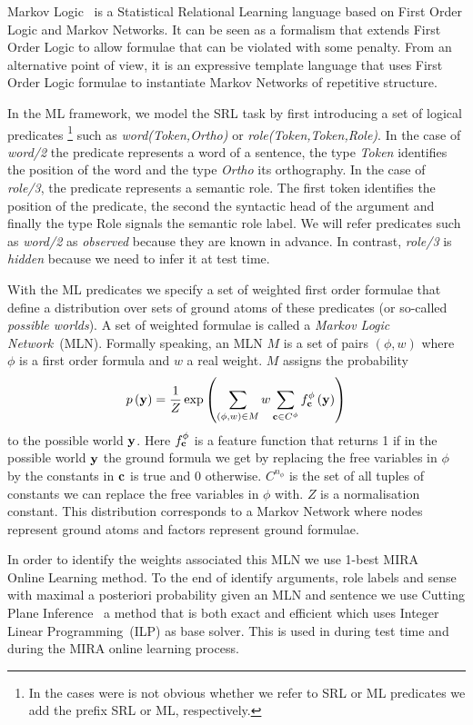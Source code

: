 Markov Logic~\citep[ML,][]{richardson05markov} is a Statistical Relational 
Learning language based on First Order Logic and Markov Networks. It can be seen 
as a formalism that extends First Order Logic to allow formulae that can be 
violated with some penalty. From an alternative point of view, it is an 
expressive template language that uses First Order Logic formulae to instantiate
Markov Networks of repetitive structure. 

In the ML framework,  we model the SRL task by first introducing a set of 
logical predicates \footnote{In the cases were is not obvious whether we refer 
to SRL or ML predicates we add the prefix SRL or ML, respectively.} such as 
\emph{word(Token,Ortho)} or \emph{role(Token,Token,Role)}. In the case of 
\emph{word/2} the predicate represents a word of a sentence, the type 
\emph{Token} identifies the position of the word and the type \emph{Ortho} its 
orthography. In the case of \emph{role/3}, the predicate represents a semantic 
role. The first token identifies the position of the predicate, the second the 
syntactic head of the argument and finally the type Role signals the semantic 
role label. We will refer predicates such as \emph{word/2} as \emph{observed} 
because they are known in advance. In contrast, \emph{role/3} is \emph{hidden} 
because we need to infer it at test time.

With the ML predicates we specify a set of weighted first order formulae that 
define a distribution over sets of ground atoms of these predicates (or 
so-called \emph{possible worlds}). A set of weighted formulae is called a 
\emph{Markov Logic Network}~(MLN). Formally speaking, an MLN $M$ is a set of 
pairs $\left(\phi,w\right)$ where $\phi$ is a first order formula and $w$ a real 
weight. $M$ assigns the probability
\begin{equation}
p\left(\mathbf{y}\right)=\frac{1}{Z}\exp\left(
\sum_{\left(\phi,w\right)\in M} w
\sum_{\mathbf{c}\in C^{\phi}}f_{\mathbf{c}}^{\phi}\left(\mathbf{y}\right)
\right)
\label{eq:prob}
\end{equation}
to the possible world $\mathbf{y}$. Here $f_{\mathbf{c}}^{\phi}$ is a feature
function that returns 1 if in the possible world $\mathbf{y}$ the ground
formula we get by replacing the free variables in $\phi$ by the constants
in $\mathbf{c}$ is true and 0 otherwise. $C^{n_{\phi}}$ is the set
of all tuples of constants we can replace the free variables in $\phi$
with. $Z$ is a normalisation constant. This distribution corresponds to a Markov 
Network where nodes represent ground atoms and factors represent ground 
formulae.  

In order to identify the weights associated this MLN we use 1-best 
MIRA~\citep{crammer01ultraconservative} Online Learning method. To the end of 
identify arguments, role labels and sense  with maximal a posteriori probability 
given an MLN and sentence we use Cutting Plane 
Inference~\citep[CPI,][]{riedel08improving} a method that is both exact and 
efficient which uses Integer Linear Programming~(ILP) as base solver. This is 
used in during test time and during the MIRA online learning process.

